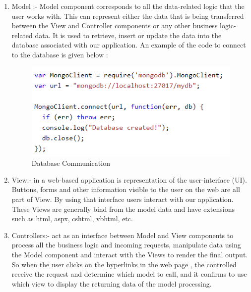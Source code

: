 \begin{enumerate}
    \setcounter{enumi}{0}
    \item Model :- Model component corresponds to all the data-related logic that the user works with. This can represent either the data that is being transferred between the View and Controller components or any other business logic-related data. It is used to retrieve, insert or update the data into the database associated with our application. An example of the code to connect to the database is given below :
\begin{figure}%
    \center%
    \includegraphics[width=1\textwidth]{images/Software/Capture.PNG}%
    \caption[Database Communication]{Database Communication}\label{fig: login}%
  \end{figure}
  
    \item View:- in a web-based application is representation of the user-interface (UI). Buttons, forms and other information visible to the user on the web are all part of View.  By using that interface users interact with our application. These Views are generally bind from the model data and have extensions such as html, aspx, cshtml,
    vbhtml, etc.
    
    \item Controllers:- act as an interface between Model and View components to process all the business logic and incoming requests, manipulate data using the Model component and interact with the Views to render the final output. So when the user clicks on the hyperlinks in the web page , the controlled receive the request and determine which model to call, and it confirms to use which view to display the returning data of the model processing.
    \end{enumerate}  

